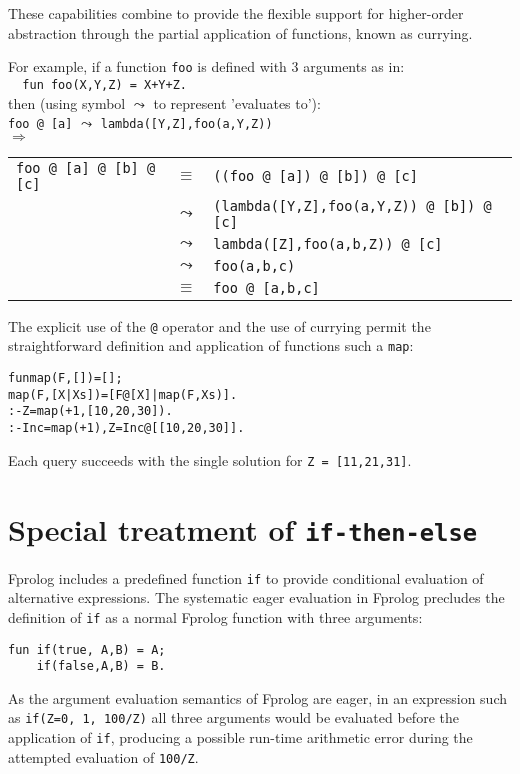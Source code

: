 \documentclass[a4paper,11pt,twoside]{article}
\begin{document}
These capabilities combine to provide the flexible support for
higher-order abstraction through the partial application of functions, known as currying.

For example, if a function \texttt{foo} is defined
with 3 arguments as in:\\
 \texttt{~~fun foo(X,Y,Z) = X+Y+Z.}\\
then (using symbol $\leadsto$ to represent 'evaluates to'):\\
\texttt{foo @ [a]} $\leadsto$ \texttt{lambda([Y,Z],foo(a,Y,Z))}\\
$\Longrightarrow$\\
\begin{tabular}{l l l}
\texttt{foo @ [a] @ [b] @ [c]}
 & $\equiv$   & \texttt{((foo @ [a]) @ [b]) @ [c]}\\
 & $\leadsto$ & \texttt{(lambda([Y,Z],foo(a,Y,Z)) @ [b]) @ [c]}\\
 & $\leadsto$ & \texttt{lambda([Z],foo(a,b,Z)) @ [c]}\\
 & $\leadsto$ & \texttt{foo(a,b,c)}\\
 & $\equiv$   & \texttt{foo @ [a,b,c]}
\end{tabular}

The explicit use of the \texttt{@} operator and the use of currying permit the
straightforward definition and application of functions such a \texttt{map}:
\begin{alltt}
fun map(F,[]) = [];                        % map definition
    map(F,[X|Xs]) = [F @ [X]|map(F,Xs)].\vspace{2mm}
:- Z = map(+1,[10,20,30]).                 % curried +
:- Inc = map(+1), Z = Inc @ [[10,20,30]].  % curried map, +
\end{alltt}
Each query succeeds with the single solution for \texttt{Z = [11,21,31]}.

\section{Special treatment of \texttt{if-then-else}} %
\label{if-then-else}

Fprolog includes a predefined function \texttt{if} to provide conditional
evaluation of alternative expressions.  The systematic eager evaluation in
Fprolog precludes the definition of \texttt{if} as a normal Fprolog function
with three arguments:
\begin{verbatim}
fun if(true, A,B) = A;
    if(false,A,B) = B.
\end{verbatim}
As the argument evaluation semantics of Fprolog are eager,
in an expression such as \texttt{if(Z=0, 1, 100/Z)} all three arguments
would be evaluated before the application of \texttt{if}, producing a
possible
run-time arithmetic error during the attempted evaluation of \texttt{100/Z}.
\end{document}
